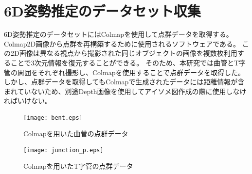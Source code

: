 \section{6D姿勢推定のデータセット収集}
6D姿勢推定のデータセットにはColmapを使用して点群データを取得する。Colmap2D画像から点群を再構築するために使用されるソフトウェアである。
この2D画像は異なる視点から撮影された同じオブジェクトの画像を複数枚利用することで3次元情報を復元することができる。
そのため、本研究では曲管とT字管の周囲をそれぞれ撮影し、Colmapを使用することで点群データを取得した。
しかし、点群データを取得してもColmapで生成されたデータには距離情報が含まれていないため、別途Depth画像を使用してアイソメ図作成の際に使用しなければいけない。
\begin{figure}[htbt]
	\centering
	 \texttt{[image: bent.eps]}
	 \caption{Colmapを用いた曲菅の点群データ}
	 \label{fig:f2}
\end{figure}

\begin{figure}[htbt]
	\centering
	 \texttt{[image: junction\_p.eps]}
	 \caption{Colmapを用いたT字管の点群データ}
	 \label{fig:f2}
\end{figure}